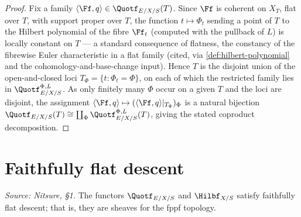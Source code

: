 \begin{proof}
  Fix a family $\langle\Ff,q\rangle\in\Quotf_{E/X/S}(T)$. Since $\Ff$ is coherent
  on $X_T$, flat over $T$, with support proper over $T$, the function
  $t\mapsto\Phi_t$ sending a point of $T$ to the Hilbert polynomial of the fibre
  $\Ff_t$ (computed with the pullback of $L$) is locally constant on $T$ --- a
  standard consequence of flatness, the constancy of the fibrewise Euler
  characteristic in a flat family (cited, via \cref{def:hilbert-polynomial} and
  the cohomology-and-base-change input). Hence $T$ is the disjoint union of the
  open-and-closed loci $T_\Phi = \{t : \Phi_t = \Phi\}$, on each of which the
  restricted family lies in $\Quotf_{E/X/S}^{\Phi,L}$. As only finitely many
  $\Phi$ occur on a given $T$ and the loci are disjoint, the assignment
  $\langle\Ff,q\rangle\mapsto(\langle\Ff,q\rangle|_{T_\Phi})_\Phi$ is a natural
  bijection $\Quotf_{E/X/S}(T)\cong\coprod_\Phi\Quotf_{E/X/S}^{\Phi,L}(T)$,
  giving the stated coproduct decomposition.
\end{proof}

\section{Faithfully flat descent}

\begin{lemma}
  \label{lem:quot-ffdescent}
  \textit{Source: Nitsure, §1.}
  The functors $\Quotf_{E/X/S}$ and $\Hilbf_{X/S}$ satisfy faithfully flat
  descent; that is, they are sheaves for the fppf topology.
\end{lemma}


